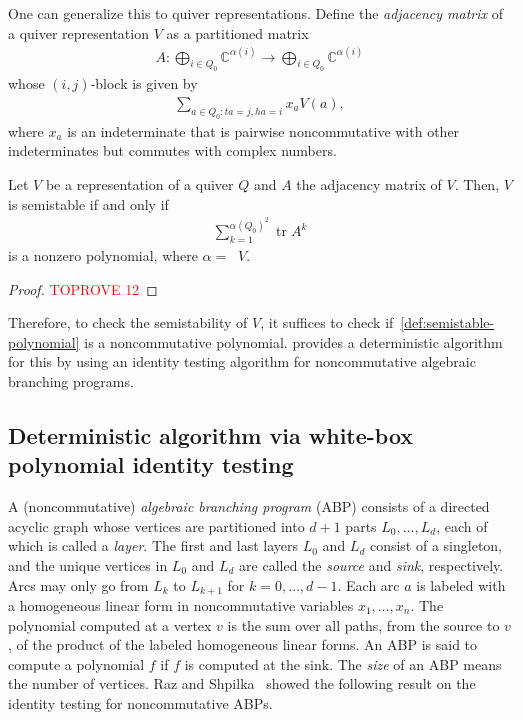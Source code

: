 \documentclass[a4paper,11pt]{article}
\numberwithin{equation}{section}
\newcommand{\C}{\mathbb{C}}
\DeclareMathOperator{\tr}{tr}
\DeclareMathOperator{\dimv}{\underline{dim}}
\begin{document}
One can generalize this to quiver representations.
Define the \emph{adjacency matrix} of a quiver representation $V$ as a partitioned matrix
\begin{align}
    A: \bigoplus_{i \in Q_0} \C^{\alpha(i)} \to \bigoplus_{i \in Q_0} \C^{\alpha(i)}
\end{align}
whose $(i,j)$-block is given by 
\begin{align}\label{eq:adj-matrix}
    \sum_{a \in Q_0: ta=j, ha=i} x_a V(a),
\end{align}
where $x_a$ is an indeterminate that is pairwise noncommutative with other indeterminates but commutes with complex numbers.

\begin{lemma}
    Let $V$ be a representation of a quiver $Q$ and $A$ the adjacency matrix of $V$.
    Then, $V$ is semistable if and only if
    \begin{align}\label{def:semistable-polynomial}
        \sum_{k=1}^{{\alpha(Q_0)}^2} \tr A^k
    \end{align}
    is a nonzero polynomial, where $\alpha = \dimv V$.
\end{lemma}
\begin{proof}\textcolor{red}{TOPROVE 12}\end{proof}

Therefore, to check the semistability of $V$, it suffices to check if~\eqref{def:semistable-polynomial} is a noncommutative polynomial.
 provides a deterministic algorithm for this by using an identity testing algorithm for noncommutative algebraic branching programs.

\subsection{Deterministic algorithm via white-box polynomial identity testing}\label{sec:deterministic}
A (noncommutative) \emph{algebraic branching program} (ABP) consists of a directed acyclic graph whose vertices are partitioned into $d+1$ parts $L_0, \dotsc, L_d$, each of which is called a \emph{layer}.
The first and last layers $L_0$ and $L_d$ consist of a singleton, and the unique vertices in $L_0$ and $L_d$ are called the \emph{source} and \emph{sink}, respectively.
Arcs may only go from $L_k$ to $L_{k+1}$ for $k = 0, \dotsc, d-1$.
Each arc $a$ is labeled with a homogeneous linear form in noncommutative variables $x_1, \dotsc, x_n$.
The polynomial computed at a vertex $v$ is the sum over all paths, from the source to $v$, of the product of the labeled homogeneous linear forms.
An ABP is said to compute a polynomial $f$ if $f$ is computed at the sink.
The \emph{size} of an ABP means the number of vertices.
Raz and Shpilka~\cite{Raz2005} showed the following result on the identity testing for noncommutative ABPs.
\end{document}
